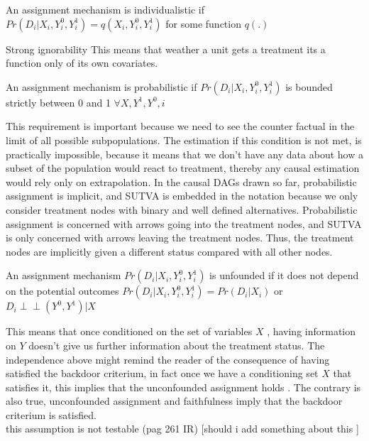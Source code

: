 \begin{ass}
An assignment mechanism is individualistic if $Pr(D_i| X_i , Y_i^0 ,Y_i^1) = q( X_i , Y_i^0 ,Y_i^1)$ for some function $q(.)$
\end{ass}{Strong ignorability}
This means that weather a unit gets a treatment its a function only of its own covariates.
\begin{ass}
An assignment mechanism is probabilistic if $Pr(D_i| X_i , Y_i^0 ,Y_i^1)$ is bounded strictly between 0 and 1 $\forall X,Y^1,Y^0,i$
\end{ass}
This requirement is important because we need to see the counter factual in the limit of all possible subpopulations. The estimation if this condition is not met, is practically impossible, because it means that we don't have any data about how a subset of the population would react to treatment, thereby any causal estimation would rely only on extrapolation.  In the causal DAGs  drawn so far, probabilistic assignment is implicit, and SUTVA is embedded in the notation because we only consider treatment nodes with binary and well defined alternatives. Probabilistic assignment is concerned with arrows going into the treatment nodes, and SUTVA is only concerned with arrows leaving the treatment nodes.
Thus, the treatment nodes are implicitly given a different status compared with all other nodes.\citep{hernan2020causal}
\begin{ass}
An assignment mechanism $Pr(D_i| X_i , Y_i^0 ,Y_i^1)$ is unfounded if  it does not depend on the potential outcomes $Pr(D_i| X_i , Y_i^0 ,Y_i^1)= Pr(D_i| X_i )$ or $D_i  \perp\!\!\!\perp (Y^{0},Y^{1}) | X$
\end{ass}
\label{ass:Unconfounded assignment}
This means that once conditioned on the set of variables ${X}$ , having information on $Y$ doesn't give us further information about the treatment status. The independence above might remind the reader of the consequence of having satisfied the backdoor criterium, in fact once we have a conditioning set ${X}$ that satisfies it, this implies that the unconfounded assignment holds \citep{cunningham2021causal}. The contrary is also true, unconfounded assignment and faithfulness imply that the backdoor criterium is satisfied. \citep{hernan2020causal}
\\
this assumption is not testable (pag 261 IR) [should i add something about this ]
